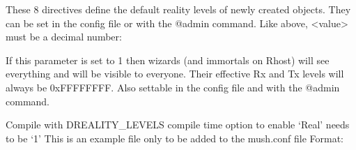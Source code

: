 \documentclass[letterpaper,10pt,english]{sphinxmanual}
\begin{document}
\begin{sphinxVerbatim}[commandchars=\\\{\}]
 
 
 
 
 
 
 
 
\end{sphinxVerbatim}

\sphinxAtStartPar
These 8 directives define the default reality levels of newly created
objects. They can be set in the config file or with the @admin command.
Like above, \textless{}value\textgreater{} must be a decimal number:

\begin{sphinxVerbatim}[commandchars=\\\{\}]
 
\end{sphinxVerbatim}

\sphinxAtStartPar
If this parameter is set to 1 then wizards (and immortals on Rhost) will see
everything and will be visible to everyone. Their effective Rx and Tx levels
will always be 0xFFFFFFFF. Also settable in the config file and with the
@admin command.

\sphinxAtStartPar
Compile with \sphinxhyphen{}DREALITY\_LEVELS compile time option to enable ‘Real’ needs to be ‘1’
This is an example file only to be added to the mush.conf file Format:

\begin{sphinxVerbatim}[commandchars=\\\{\}]
       
\end{sphinxVerbatim}
\end{document}
